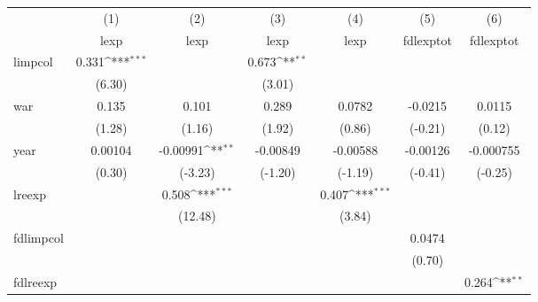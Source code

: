 {
\def\sym#1{\ifmmode^{#1}\else\(^{#1}\)\fi}
\begin{tabular}{l*{6}{c}}
\hline\hline
            &\multicolumn{1}{c}{(1)}&\multicolumn{1}{c}{(2)}&\multicolumn{1}{c}{(3)}&\multicolumn{1}{c}{(4)}&\multicolumn{1}{c}{(5)}&\multicolumn{1}{c}{(6)}\\
            &\multicolumn{1}{c}{lexp}&\multicolumn{1}{c}{lexp}&\multicolumn{1}{c}{lexp}&\multicolumn{1}{c}{lexp}&\multicolumn{1}{c}{fdlexptot}&\multicolumn{1}{c}{fdlexptot}\\
\hline
limpcol     &       0.331\sym{***}&                     &       0.673\sym{**} &                     &                     &                     \\
            &      (6.30)         &                     &      (3.01)         &                     &                     &                     \\
[1em]
war         &       0.135         &       0.101         &       0.289         &      0.0782         &     -0.0215         &      0.0115         \\
            &      (1.28)         &      (1.16)         &      (1.92)         &      (0.86)         &     (-0.21)         &      (0.12)         \\
[1em]
year        &     0.00104         &    -0.00991\sym{**} &    -0.00849         &    -0.00588         &    -0.00126         &   -0.000755         \\
            &      (0.30)         &     (-3.23)         &     (-1.20)         &     (-1.19)         &     (-0.41)         &     (-0.25)         \\
[1em]
lreexp      &                     &       0.508\sym{***}&                     &       0.407\sym{***}&                     &                     \\
            &                     &     (12.48)         &                     &      (3.84)         &                     &                     \\
[1em]
fdlimpcol   &                     &                     &                     &                     &      0.0474         &                     \\
            &                     &                     &                     &                     &      (0.70)         &                     \\
[1em]
fdlreexp    &                     &                     &                     &                     &                     &       0.264\sym{**} \\

\end{tabular}}
